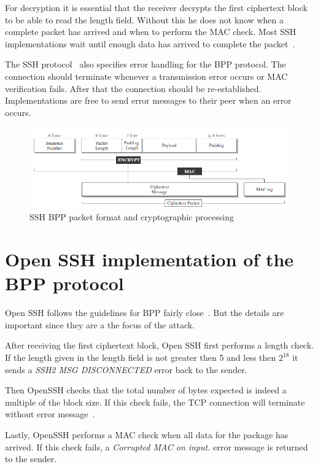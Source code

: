\documentclass[twocolumn]{article}
\begin{document}
\indent For decryption it is essential that the receiver decrypts the first ciphertext block to be able to read the length field. Without this he does not know when a complete packet has arrived and when to perform the MAC check. Most SSH implementations wait until enough data has arrived to complete the packet~\cite{Albrecht2009}.

\indent The SSH protocol~\cite{Ylonen2006} also specifies error handling for the BPP protocol. The connection should terminate whenever a transmission error occurs or MAC verification fails. After that the connection should be re-established. Implementations are free to send error messages to their peer when an error occurs.

\begin{figure}
	  \centering
    	\includegraphics[scale=.6]{SSHBPP.png}
	\caption{SSH BPP packet format and cryptographic processing~\cite{Albrecht2009}}
	\label{fig:BPPProtocol}
\end{figure}

\section{Open SSH implementation of the BPP protocol}

\indent Open SSH follows the guidelines for BPP fairly close~\cite{Albrecht2009}. But the details are important since they are a the focus of the attack.

\indent After receiving the first ciphertext block, Open SSH first performs a length check. If the length given in the length field is not greater then 5 and less then $2^{18}$ it sends a \textit{SSH2 MSG DISCONNECTED} error back to the sender.

\indent Then OpenSSH checks that the total number of bytes expected is indeed a multiple of the block size. If this check fails, the TCP connection will terminate without error message~\cite{Albrecht2009}.

\indent Lastly, OpenSSH performs a MAC check when all data for the package has arrived. If this check fails, a \textit{Corrupted MAC on input.} error message is returned to the sender.
\end{document}

